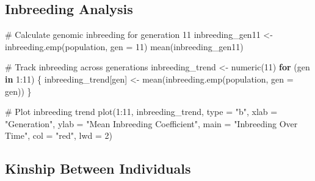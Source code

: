 \documentclass[
  letterpaper,
]{book}
\newenvironment{Shaded}{\begin{snugshade}}{\end{snugshade}}
\newcommand{\AttributeTok}[1]{\textcolor[rgb]{0.40,0.45,0.13}{#1}}
\newcommand{\CommentTok}[1]{\textcolor[rgb]{0.37,0.37,0.37}{#1}}
\newcommand{\ControlFlowTok}[1]{\textcolor[rgb]{0.00,0.23,0.31}{\textbf{#1}}}
\newcommand{\DecValTok}[1]{\textcolor[rgb]{0.68,0.00,0.00}{#1}}
\newcommand{\FunctionTok}[1]{\textcolor[rgb]{0.28,0.35,0.67}{#1}}
\newcommand{\NormalTok}[1]{\textcolor[rgb]{0.00,0.23,0.31}{#1}}
\newcommand{\OtherTok}[1]{\textcolor[rgb]{0.00,0.23,0.31}{#1}}
\newcommand{\SpecialCharTok}[1]{\textcolor[rgb]{0.37,0.37,0.37}{#1}}
\newcommand{\StringTok}[1]{\textcolor[rgb]{0.13,0.47,0.30}{#1}}
\begin{document}
\subsection{Inbreeding Analysis}\label{inbreeding-analysis}

\begin{Shaded}
\begin{Highlighting}[]
\CommentTok{\# Calculate genomic inbreeding for generation 11}
\NormalTok{inbreeding\_gen11 }\OtherTok{\textless{}{-}} \FunctionTok{inbreeding.emp}\NormalTok{(population, }\AttributeTok{gen =} \DecValTok{11}\NormalTok{)}
\FunctionTok{mean}\NormalTok{(inbreeding\_gen11)}

\CommentTok{\# Track inbreeding across generations}
\NormalTok{inbreeding\_trend }\OtherTok{\textless{}{-}} \FunctionTok{numeric}\NormalTok{(}\DecValTok{11}\NormalTok{)}
\ControlFlowTok{for}\NormalTok{ (gen }\ControlFlowTok{in} \DecValTok{1}\SpecialCharTok{:}\DecValTok{11}\NormalTok{) \{}
\NormalTok{  inbreeding\_trend[gen] }\OtherTok{\textless{}{-}} \FunctionTok{mean}\NormalTok{(}\FunctionTok{inbreeding.emp}\NormalTok{(population, }\AttributeTok{gen =}\NormalTok{ gen))}
\NormalTok{\}}

\CommentTok{\# Plot inbreeding trend}
\FunctionTok{plot}\NormalTok{(}\DecValTok{1}\SpecialCharTok{:}\DecValTok{11}\NormalTok{, inbreeding\_trend,}
     \AttributeTok{type =} \StringTok{"b"}\NormalTok{,}
     \AttributeTok{xlab =} \StringTok{"Generation"}\NormalTok{,}
     \AttributeTok{ylab =} \StringTok{"Mean Inbreeding Coefficient"}\NormalTok{,}
     \AttributeTok{main =} \StringTok{"Inbreeding Over Time"}\NormalTok{,}
     \AttributeTok{col =} \StringTok{"red"}\NormalTok{, }\AttributeTok{lwd =} \DecValTok{2}\NormalTok{)}
\end{Highlighting}
\end{Shaded}

\subsection{Kinship Between
Individuals}\label{kinship-between-individuals}
\end{document}
